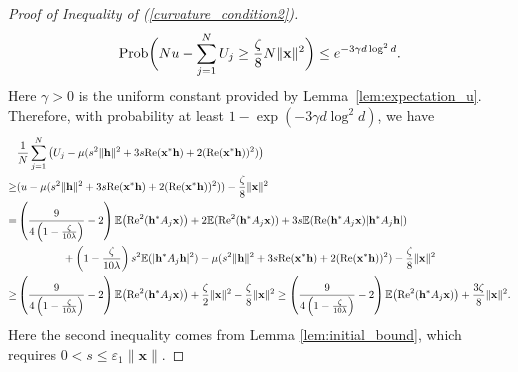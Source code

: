 \documentclass{article}
\renewcommand{\eqref}[1]{(\ref{#1})}
\newcommand{\E}{{\mathbb E}}
\newcommand{\Prob}{{\rm Prob}}
\newcommand{\re}{{\rm Re}}
\newcommand{\vx}{{\mathbf x}}
\newcommand{\vh}{{\mathbf h}}
\newcommand{\0}{{\mathbf 0}}
\numberwithin{equation}{section}
\begin{document}
\begin{proof}[Proof of Inequality of \eqref{curvature_condition2}]
\begin{align*}
		\Prob\bigg(Nu - \sum_{j=1}^{N}U_j\geq\frac{\zeta}{8}N\|\vx\|^2 \bigg)\leq e^{-3\gamma d\log^2d}.
	\end{align*}
	Here $\gamma>0$ is the uniform constant provided by Lemma~\ref{lem:expectation_u}. 
	Therefore, with probability at least $ 1-\exp(-3\gamma d\log^2d) $, we have
	\begin{align}
		&\frac{1}{N}\sum_{j=1}^{N}\big(U_j-\mu(s^2\|\vh\|^2+3s\re(\vx^*\vh)+2(\re(\vx^*\vh))^2)\big)\nonumber\\
		\geq& (u-\mu(s^2\|\vh\|^2+3s\re(\vx^*\vh)+2(\re(\vx^*\vh))^2))- \frac{\zeta}{8}\|\vx\|^2\nonumber\\
		=&\left(\frac{9}{4\left(1-\frac{\zeta}{10\lambda}\right)}-2\right)\E\big(\re^2(\vh^*A_j\vx)\big)+2\E(\re^2(\vh^*A_j\vx)) + 3s\E(\re(\vh^*A_j\vx)|\vh^*A_j\vh|)\nonumber\\
		&\hspace{1.5cm}+\left(1-\frac{\zeta}{10\lambda}\right)s^2\E(|\vh^*A_j\vh|^2)-\mu(s^2\|\vh\|^2+3s\re(\vx^*\vh)+2(\re(\vx^*\vh))^2)-\frac{\zeta}{8}\|\vx\|^2\nonumber\\
		\geq& \left(\frac{9}{4\left(1-\frac{\zeta}{10\lambda}\right)}-2\right)\E\big(\re^2(\vh^*A_j\vx)\big)+\frac{\zeta}{2}\|\vx\|^2-\frac{\zeta}{8}\|\vx\|^2
		\geq	 \left(\frac{9}{4\left(1-\frac{\zeta}{10\lambda}\right)}-2\right)\E\big(\re^2(\vh^*A_j\vx)\big)+\frac{3\zeta}{8}\|\vx\|^2.\label{eq:fix-all}
	\end{align}
	Here the second inequality comes from Lemma \ref{lem:initial_bound}, which requires $0<s\le\varepsilon_1\|\vx\|$. 
	

\end{proof}
\end{document}
